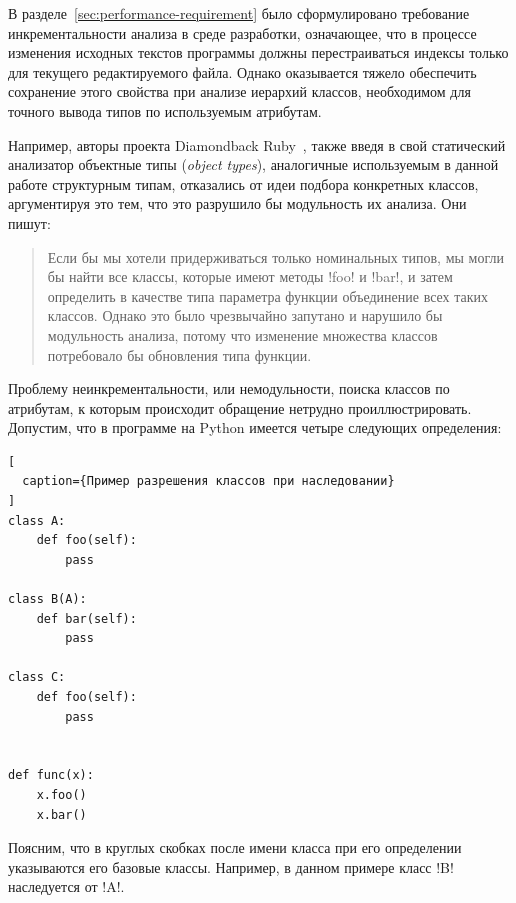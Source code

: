 В разделе~\ref{sec:performance-requirement} было сформулировано требование
инкрементальности анализа в среде разработки, означающее, что в процессе
изменения исходных текстов программы должны перестраиваться индексы только для
текущего редактируемого файла. Однако оказывается тяжело обеспечить сохранение этого
свойства при анализе иерархий классов, необходимом для точного вывода типов по
используемым атрибутам.

Например, авторы проекта Diamondback Ruby~\cite{Furr2009}, также введя в свой
статический анализатор объектные типы (\emph{object types}), аналогичные
используемым в данной работе структурным типам, отказались от идеи
подбора конкретных классов, аргументируя это тем, что это разрушило бы
модульность их анализа. Они пишут:

\begin{quote}
  Если бы мы хотели придерживаться только номинальных типов, мы могли бы найти
  все классы, которые имеют методы !foo! и !bar!, и затем определить в качестве
  типа параметра функции объединение всех таких классов. Однако это было чрезвычайно
  запутано и нарушило бы модульность анализа, потому что изменение множества
  классов потребовало бы обновления типа функции.

\end{quote}

Проблему неинкрементальности, или немодульности, поиска классов по атрибутам, к
которым происходит обращение нетрудно проиллюстрировать. Допустим, что в
программе на Python имеется четыре следующих определения:

\begin{lstlisting}[
  caption={Пример разрешения классов при наследовании}
]
class A:
    def foo(self):
        pass

class B(A):
    def bar(self):
        pass

class C:
    def foo(self):
        pass


def func(x):
    x.foo()
    x.bar()

\end{lstlisting}

Поясним, что в круглых скобках после имени класса при его определении
указываются его базовые классы. Например, в данном примере класс !B! наследуется
от !A!.

